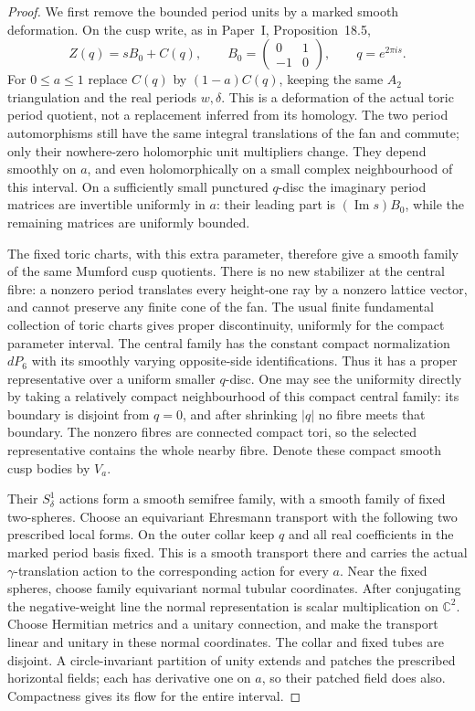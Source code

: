 \begin{proof}
We first remove the bounded period units by a marked smooth
deformation. On the cusp write, as in Paper~I, Proposition~18.5,
\[
 Z(q)=sB_0+C(q),\qquad
 B_0=\begin{pmatrix}0&1\\-1&0\end{pmatrix},\qquad
 q=e^{2\pi i s}.
\]
For $0\leq a\leq1$ replace $C(q)$ by $(1-a)C(q)$, keeping
the same $A_2$ triangulation and the real periods $w,\delta$.
This is a deformation of the actual toric period quotient,
not a replacement inferred from its homology. The two period
automorphisms still have the same integral translations of the
fan and commute; only their nowhere-zero holomorphic unit
multipliers change. They depend smoothly on $a$, and even
holomorphically on a small complex neighbourhood of this
interval. On a sufficiently small punctured $q$-disc the
imaginary period matrices are invertible uniformly in $a$:
their leading part is $(\operatorname{Im}s)B_0$, while the
remaining matrices are uniformly bounded.

The fixed toric charts, with this extra parameter, therefore
give a smooth family of the same Mumford cusp quotients.
There is no new stabilizer at the central fibre: a nonzero
period translates every height-one ray by a nonzero lattice
vector, and cannot preserve any finite cone of the fan.
The usual finite fundamental collection of toric charts gives
proper discontinuity, uniformly for the compact parameter
interval. The central family has the constant compact
normalization $dP_6$ with its smoothly varying opposite-side
identifications. Thus it has a proper representative over a
uniform smaller $q$-disc. One may see the uniformity directly
by taking a relatively compact neighbourhood of this compact
central family: its boundary is disjoint from $q=0$, and after
shrinking $|q|$ no fibre meets that boundary. The nonzero
fibres are connected compact tori, so the selected representative
contains the whole nearby fibre. Denote these compact smooth
cusp bodies by $V_a$.

Their $S^1_\delta$ actions form a smooth semifree family, with
a smooth family of fixed two-spheres. Choose an equivariant
Ehresmann transport with the following two prescribed local
forms. On the outer collar keep $q$ and all real coefficients
in the marked period basis fixed. This is a smooth transport
there and carries the actual $\gamma$-translation action to
the corresponding action for every $a$. Near the fixed spheres,
choose family equivariant normal tubular coordinates. After
conjugating the negative-weight line the normal representation
is scalar multiplication on $\mathbb C^2$. Choose Hermitian
metrics and a unitary connection, and make the transport
linear and unitary in these normal coordinates. The collar
and fixed tubes are disjoint. A circle-invariant partition of
unity extends and patches the prescribed horizontal fields;
each has derivative one on $a$, so their patched field does
also. Compactness gives its flow for the entire interval.


\end{proof}
